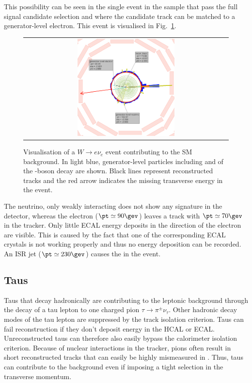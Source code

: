 This possibility can be seen in the single event in the \WJets sample that pass the full signal candidate selection and where the candidate track can be matched to a generator-level electron. 
This event is visualised in Fig.~\ref{fig:LostElectron}. 
\begin{figure}[!t]
  \centering 
  \begin{tabular}{c}
    \includegraphics[width=0.49\textwidth]{figures/analysis/Electron_lumi_279317_event_111637553.png}
  \end{tabular}
 \caption{Visualisation of a $W\rightarrow e\nu_e$ event contributing to the SM background. 
          In light blue, generator-level particles including \lel and \nue of the \W-boson decay are shown. 
          Black lines represent reconstructed tracks and the red arrow indicates the missing transverse energy in the event.}
  \label{fig:LostElectron}
\end{figure}
The neutrino, only weakly interacting does not show any signature in the detector, whereas the electron ($\pt\simeq 90\gev$) leaves a track with $\pt\simeq 70\gev$ in the tracker. 
Only little ECAL energy deposits in the direction of the electron are visible. 
This is caused by the fact that one of the corresponding ECAL crystals is not working properly and thus no energy deposition can be recorded.
An ISR jet ($\pt\simeq 230\gev$) causes the \met in the event. 
 

\subsection*{Taus}
Taus that decay hadronically are contributing to the leptonic background through the decay of a tau lepton to one charged pion $\tau\rightarrow\pi^{\pm}\nu_{\tau}$.
Other hadronic decay modes of the tau lepton are suppressed by the track isolation criterion.
Taus can fail reconstruction if they don't deposit energy in the HCAL or ECAL.
Unreconstructed taus can therefore also easily bypass the calorimeter isolation criterion.
Because of nuclear interactions in the tracker, pions often result in short reconstructed tracks that can easily be highly mismeasured in \pt.
Thus, taus can contribute to the background even if imposing a tight selection in the transverse momentum.

